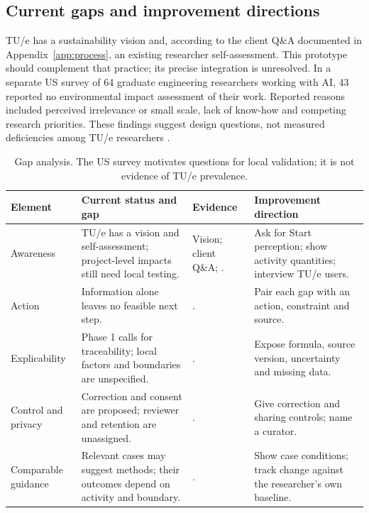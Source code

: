\subsection{Current gaps and improvement directions}
TU/e has a sustainability vision and, according to the client Q\&A documented in Appendix~\ref{app:process}, an existing researcher self-assessment. This prototype should complement that practice; its precise integration is unresolved. In a separate US survey of 64 graduate engineering researchers working with AI, 43 reported no environmental impact assessment of their work. Reported reasons included perceived irrelevance or small scale, lack of know-how and competing research priorities. These findings suggest design questions, not measured deficiencies among TU/e researchers \citep{shiekh2026graduate}.
\begin{table}[H]
\centering\footnotesize
\begin{tabularx}{\textwidth}{@{}>{\raggedright\arraybackslash}p{}>{\raggedright\arraybackslash}p{}>{\raggedright\arraybackslash}p{}>{\raggedright\arraybackslash}X@{}}
\toprule
Element & Current status and gap & Evidence & Improvement direction \\
\midrule
Awareness & TU/e has a vision and self-assessment; project-level impacts still need local testing. & Vision; client Q\&A; \citep{shiekh2026graduate}. & Ask for Start perception; show activity quantities; interview TU/e users. \\
Action & Information alone leaves no feasible next step. & \citep{shiekh2026graduate,abrahamse2005review}. & Pair each gap with an action, constraint and source. \\
Explicability & Phase 1 calls for traceability; local factors and boundaries are unspecified. & \citep{friedman2019shaping}. & Expose formula, source version, uncertainty and missing data. \\
Control and privacy & Correction and consent are proposed; reviewer and retention are unassigned. & \citep{santoni2018control,nissenbaum2004privacy}. & Give correction and sharing controls; name a curator. \\
Comparable guidance & Relevant cases may suggest methods; their outcomes depend on activity and boundary. & \citep{oecd2008composite}. & Show case conditions; track change against the researcher's own baseline. \\
\bottomrule
\end{tabularx}
\caption{Gap analysis. The US survey motivates questions for local validation; it is not evidence of TU/e prevalence.}
\label{tab:phase2-gaps}
\end{table}

